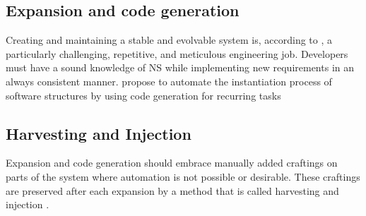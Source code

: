 \subsection{Expansion and code generation} \label{subsec_expansion}

Creating and maintaining a stable and evolvable system is, according to
\textcite[403]{mannaert_normalized_2016}, a particularly challenging, repetitive, and
meticulous engineering job. Developers must have a sound knowledge of NS while
implementing new requirements in an always consistent manner.
\textcite[403]{mannaert_normalized_2016} propose to automate the instantiation process of
software structures by using code generation for recurring tasks

\subsection{Harvesting and Injection}
Expansion and code generation should embrace manually added craftings on parts of the
system where automation is not possible or desirable. These craftings are preserved after
each expansion by a method that is called harvesting and injection
\parencite[405-406]{mannaert_normalized_2016}.